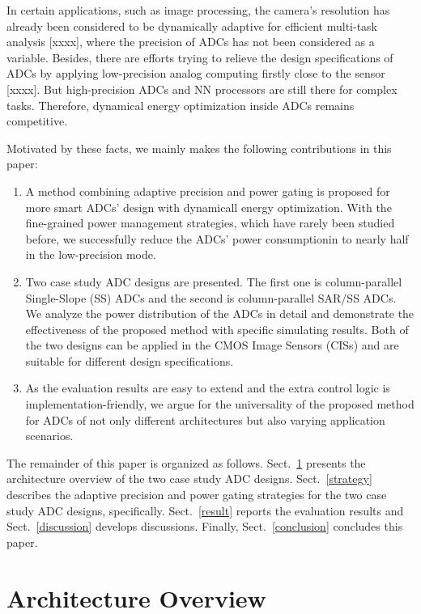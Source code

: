 \documentclass[conference]{IEEEtran}
\begin{document}
In certain applications, such as image processing, the camera’s resolution has already been considered to be dynamically adaptive for efficient multi-task analysis [xxxx], where the precision of ADCs has not been considered as a variable. Besides, there are efforts trying to relieve the design specifications of ADCs by applying low-precision analog computing firstly close to the sensor [xxxx]. But high-precision ADCs and NN processors are still there for complex tasks. Therefore, dynamical energy optimization inside ADCs remains competitive.

Motivated by these facts, we mainly makes the following contributions in this paper:
\begin{enumerate}[\IEEEsetlabelwidth{3)}]
	\item A method combining adaptive precision and power gating is proposed for more smart ADCs' design with dynamicall energy optimization. With the fine-grained power management strategies, which have rarely been studied before, we successfully reduce the ADCs' power consumptionin to nearly half in the low-precision mode.
	\item Two case study ADC designs are presented. The first one is column-parallel Single-Slope (SS) ADCs and the second is column-parallel SAR/SS ADCs. We analyze the power distribution of the ADCs in detail and demonstrate the effectiveness of the proposed method with specific simulating results. Both of the two designs can be applied in the CMOS Image Sensors (CISs) and are suitable for different design specifications. 
	\item As the evaluation results are easy to extend and the extra control logic is implementation-friendly, we argue for the universality of the proposed method for ADCs of not only different architectures but also varying application scenarios.
\end{enumerate} 

The remainder of this paper is organized as follows. Sect.~\ref{architecture} presents the architecture overview of the two case study ADC designs. Sect.~\ref{strategy} describes the adaptive precision and power gating strategies for the two case study ADC designs, specifically. Sect.~\ref{result} reports the evaluation results and Sect.~\ref{discussion} develops discussions. Finally, Sect.~\ref{conclusion} concludes this paper.

\section{Architecture Overview}\label{architecture}
\end{document}

